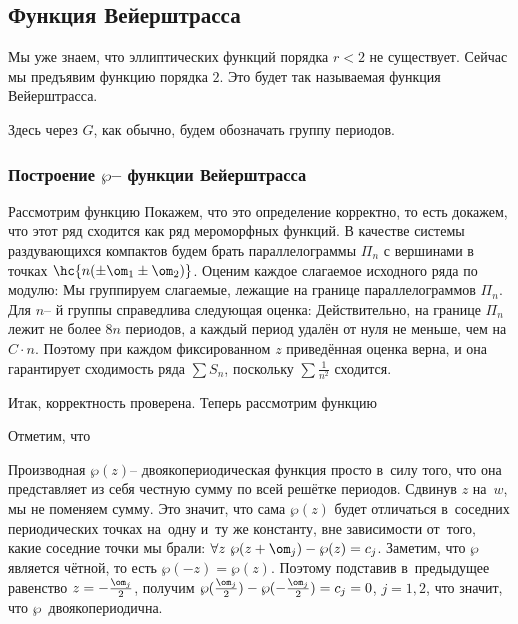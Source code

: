 \documentclass[a4paper]{article}
\begin{document}
\subsection{Функция Вейерштрасса}

Мы уже знаем, что эллиптических функций порядка $r < 2$ не существует.
Сейчас мы предъявим функцию порядка $2$. Это будет так называемая функция Вейерштрасса.

Здесь через $G$, как обычно, будем обозначать группу периодов.

\subsubsection{Построение $\wp$-- функции Вейерштрасса}

Рассмотрим функцию
Покажем, что это определение корректно, то есть докажем, что этот ряд сходится как ряд мероморфных функций.
В качестве системы раздувающихся компактов будем брать параллелограммы $\Pi_n$ с вершинами в точках
$\hc{n(\pm \om_1 \pm \om_2)}$. Оценим каждое слагаемое исходного ряда по модулю:
Мы группируем слагаемые, лежащие на границе параллелограммов $\Pi_n$. Для $n$-- й группы справедлива
следующая оценка:
Действительно, на границе $\Pi_n$ лежит не более $8n$ периодов, а каждый период удалён от нуля
не меньше, чем на $C\cdot n$. Поэтому при каждом фиксированном $z$ приведённая оценка верна,
и она гарантирует сходимость ряда $\sum S_n$, поскольку $\sum\frac1{n^2}$ сходится.

Итак, корректность проверена. Теперь рассмотрим функцию

Отметим, что

Производная $\wp(z)$-- двоякопериодическая функция просто в~силу того, что она представляет
из себя честную сумму по всей решётке периодов. Сдвинув $z$ на~$w$, мы не поменяем сумму.
Это значит, что сама $\wp(z)$ будет отличаться в~соседних периодических точках на~одну и~ту же константу,
вне зависимости от~того, какие соседние точки мы брали:
$\forall z \ \wp(z+\om_j) - \wp(z) = c_j$.
Заметим, что $\wp$ является чётной, то есть $\wp(-z) = \wp(z)$.
Поэтому подставив в~предыдущее равенство $z = -\frac{\om_j}{2}$, получим
$\wp(\frac{\om_j}{2}) - \wp(-\frac{\om_j}{2}) = c_j = 0$, $j=1,2$, что значит, что $\wp$~двоякопериодична.
\end{document}
